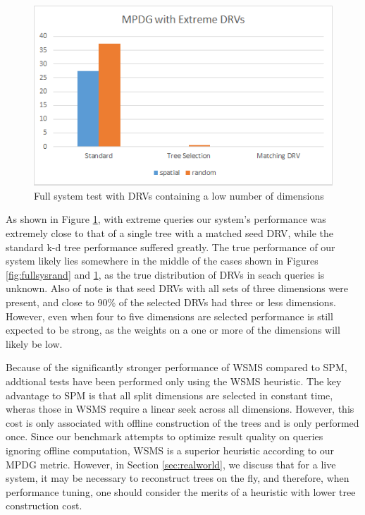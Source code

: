 \begin{figure}[h]
\begin{center}
\includegraphics[width=.85\textwidth]{Figures/fullsysext}
\end{center}
\caption{Full system test with DRVs containing a low number of dimensions}
\label{fig:fullsysext}
\end{figure}

As shown in Figure \ref{fig:fullsysext}, with extreme queries our system's performance was extremely close to that of a single tree with a matched seed DRV, while the standard k-d tree performance suffered greatly.  The true performance of our system likely lies somewhere in the middle of the cases shown in Figures \ref{fig:fullsysrand} and \ref{fig:fullsysext}, as the true distribution of DRVs in seach queries is unknown.  Also of note is that seed DRVs with all sets of three dimensions were present, and close to 90\% of the selected DRVs had three or less dimensions.  However, even when four to five dimensions are selected performance is still expected to be strong, as the weights on a one or more of the dimensions will likely be low.

Because of the significantly stronger performance of WSMS compared to SPM, addtional tests have been performed only using the WSMS heuristic.  The key advantage to SPM is that all split dimensions are selected in constant time, wheras those in WSMS require a linear seek across all dimensions.  However, this cost is only associated with offline construction of the trees and is only performed once.  Since our benchmark attempts to optimize result quality on queries ignoring offline computation, WSMS is a superior heuristic according to our MPDG metric.  However, in Section \ref{sec:realworld}, we discuss that for a live system, it may be necessary to reconstruct trees on the fly, and therefore, when performance tuning, one should consider the merits of a heuristic with lower tree construction cost.

